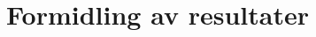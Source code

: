 \documentclass{article}
\begin{document}
    \newpage

    
    
    \section{Formidling av resultater}
    
    \vspace{5mm}
    
\end{document}

